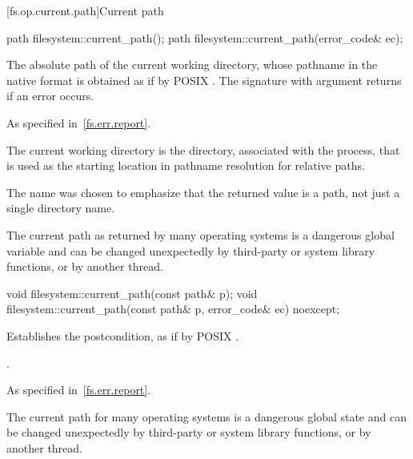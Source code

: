[fs.op.current.path]{Current path}

%
\begin{itemdecl}
path filesystem::current_path();
path filesystem::current_path(error_code& ec);
\end{itemdecl}

\begin{itemdescr}
\pnum
\returns
The absolute path of the current working directory,
  whose pathname in the native format is
  obtained as if by POSIX .
  The signature with argument  returns  if an
  error occurs.

\pnum
\throws
As specified in~\ref{fs.err.report}.

\pnum
\remarks
The current working directory is the directory, associated
  with the process, that is used as the starting location in pathname resolution
  for relative paths.

\pnum
\begin{note}
The  name was chosen to emphasize that the returned value is a
  path, not just a single directory name.
\end{note}

\pnum
\begin{note}
The current path as returned by many operating systems is a dangerous
  global variable and can be changed unexpectedly by third-party or system
  library functions, or by another thread.
\end{note}
\end{itemdescr}

%
\begin{itemdecl}
void filesystem::current_path(const path& p);
void filesystem::current_path(const path& p, error_code& ec) noexcept;
\end{itemdecl}

\begin{itemdescr}
\pnum
\effects
Establishes the postcondition, as if by POSIX .

\pnum
\ensures
{}.

\pnum
\throws
As specified in~\ref{fs.err.report}.

\pnum
\begin{note}
The current path for many operating systems is a dangerous
  global state and can be changed unexpectedly by third-party or system
  library functions, or by another thread.
\end{note}
\end{itemdescr}

